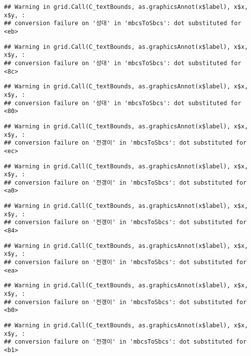 \documentclass[
]{article}
\begin{document}
\begin{verbatim}
## Warning in grid.Call(C_textBounds, as.graphicsAnnot(x$label), x$x, x$y, :
## conversion failure on '성대' in 'mbcsToSbcs': dot substituted for <eb>
\end{verbatim}

\begin{verbatim}
## Warning in grid.Call(C_textBounds, as.graphicsAnnot(x$label), x$x, x$y, :
## conversion failure on '성대' in 'mbcsToSbcs': dot substituted for <8c>
\end{verbatim}

\begin{verbatim}
## Warning in grid.Call(C_textBounds, as.graphicsAnnot(x$label), x$x, x$y, :
## conversion failure on '성대' in 'mbcsToSbcs': dot substituted for <80>
\end{verbatim}

\begin{verbatim}
## Warning in grid.Call(C_textBounds, as.graphicsAnnot(x$label), x$x, x$y, :
## conversion failure on '전갱이' in 'mbcsToSbcs': dot substituted for <ec>
\end{verbatim}

\begin{verbatim}
## Warning in grid.Call(C_textBounds, as.graphicsAnnot(x$label), x$x, x$y, :
## conversion failure on '전갱이' in 'mbcsToSbcs': dot substituted for <a0>
\end{verbatim}

\begin{verbatim}
## Warning in grid.Call(C_textBounds, as.graphicsAnnot(x$label), x$x, x$y, :
## conversion failure on '전갱이' in 'mbcsToSbcs': dot substituted for <84>
\end{verbatim}

\begin{verbatim}
## Warning in grid.Call(C_textBounds, as.graphicsAnnot(x$label), x$x, x$y, :
## conversion failure on '전갱이' in 'mbcsToSbcs': dot substituted for <ea>
\end{verbatim}

\begin{verbatim}
## Warning in grid.Call(C_textBounds, as.graphicsAnnot(x$label), x$x, x$y, :
## conversion failure on '전갱이' in 'mbcsToSbcs': dot substituted for <b0>
\end{verbatim}

\begin{verbatim}
## Warning in grid.Call(C_textBounds, as.graphicsAnnot(x$label), x$x, x$y, :
## conversion failure on '전갱이' in 'mbcsToSbcs': dot substituted for <b1>
\end{verbatim}
\end{document}
